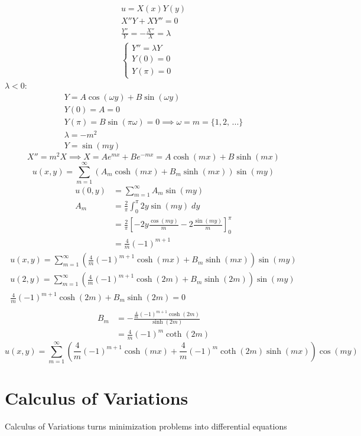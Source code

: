 \documentclass[10pt]{article}
\begin{document}
\begin{gather*}
    u = X(x)Y(y)\\
    X''Y + XY'' = 0\\
    \frac{Y''}{Y} = -\frac{X''}{X} = \lambda\\
    \begin{cases}
        Y'' = \lambda Y\\
        Y(0) = 0\\
        Y(\pi) = 0
    \end{cases}
\end{gather*}
$\lambda < 0$:
\begin{gather*}
    Y = A\cos(\omega y) + B\sin(\omega y)\\
    Y(0) = A = 0\\
    Y(\pi) = B\sin(\pi \omega) = 0 \implies \omega = m = \{1, 2, \, ...\}\\
    \lambda = -m^2\\
    Y = \sin(my)
\end{gather*}
\[X'' = m^2X \implies X = Ae^{mx} + Be^{-mx} = A\cosh(mx) + B\sinh(mx)\]
\[u(x, y) = \sum_{m=1}^\infty (A_m\cosh(mx) + B_m\sinh(mx))\sin(my)\]
\begin{align*}
    u(0, y) &= \sum_{m=1}^\infty A_m \sin(my)\\
    A_m &= \frac{2}{\pi}\int_0^\pi 2y\sin(my)\; dy \\
    &= \frac{2}{\pi}\left[-2y\frac{\cos(my)}{m} - 2\frac{\sin(my)}{m}\right]_0^\pi\\
    &= \frac{4}{m}(-1)^{m+1}
\end{align*}
\begin{gather*}
    u(x, y) = \sum_{m=1}^\infty (\frac{4}{m}(-1)^{m+1}\cosh(mx) + B_m\sinh(mx))\sin(my)\\
    u(2, y) = \sum_{m=1}^\infty (\frac{4}{m}(-1)^{m+1}\cosh(2m) + B_m\sinh(2m))\sin(my)\\
    \frac{4}{m}(-1)^{m+1}\cosh(2m) + B_m\sinh(2m) = 0\\
\end{gather*}
\begin{align*}
    B_m &= -\frac{\frac{4}{m}(-1)^{m+1}\cosh(2m)}{\sinh(2m)}\\
    &= \frac{4}{m}(-1)^m\coth(2m)
\end{align*}
\[u(x, y) = \sum_{m=1}^\infty (\frac{4}{m}(-1)^{m+1}\cosh(mx) + \frac{4}{m}(-1)^m\coth(2m)\sinh(mx))\cos(my)\]

\section{Calculus of Variations}
Calculus of Variations turns minimization problems into differential equations 
\end{document}
